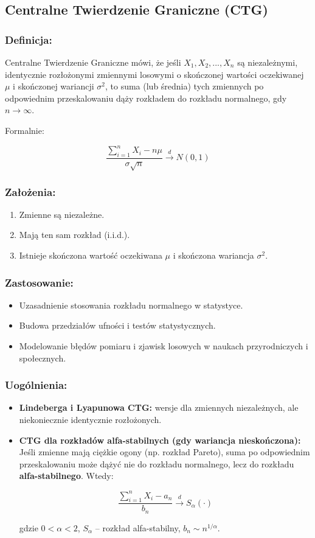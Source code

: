 \subsection{Centralne Twierdzenie Graniczne (CTG)}

\subsubsection*{Definicja:}
Centralne Twierdzenie Graniczne mówi, że jeśli $X_1, X_2, ..., X_n$ są niezależnymi, identycznie rozłożonymi zmiennymi losowymi o skończonej wartości oczekiwanej $\mu$ i skończonej wariancji $\sigma^2$, to suma (lub średnia) tych zmiennych po odpowiednim przeskalowaniu dąży rozkładem do rozkładu normalnego, gdy $n \to \infty$.

Formalnie:

$$
\frac{\sum_{i=1}^n X_i - n\mu}{\sigma \sqrt{n}} \xrightarrow{d} N(0,1)
$$

\subsubsection*{Założenia:}
\begin{enumerate}
    \item Zmienne są niezależne.
    \item Mają ten sam rozkład (i.i.d.).
    \item Istnieje skończona wartość oczekiwana $\mu$ i skończona wariancja $\sigma^2$.
\end{enumerate}

\subsubsection*{Zastosowanie:}
\begin{itemize}
    \item Uzasadnienie stosowania rozkładu normalnego w statystyce.
    \item Budowa przedziałów ufności i testów statystycznych.
    \item Modelowanie błędów pomiaru i zjawisk losowych w naukach przyrodniczych i społecznych.
\end{itemize}

\subsubsection*{Uogólnienia:}
\begin{itemize}
    \item \textbf{Lindeberga i Lyapunowa CTG:} wersje dla zmiennych niezależnych, ale niekoniecznie identycznie rozłożonych.
    \item \textbf{CTG dla rozkładów alfa-stabilnych (gdy wariancja nieskończona):}
    Jeśli zmienne mają ciężkie ogony (np. rozkład Pareto), suma po odpowiednim przeskalowaniu może dążyć nie do rozkładu normalnego, lecz do rozkładu \textbf{alfa-stabilnego}.
    Wtedy:

  $$
  \frac{\sum_{i=1}^n X_i - a_n}{b_n} \xrightarrow{d} S_\alpha(\cdot)
  $$

  gdzie $0 < \alpha < 2$, $S_\alpha$ -- rozkład alfa-stabilny, $b_n \sim n^{1/\alpha}$.
\end{itemize}

